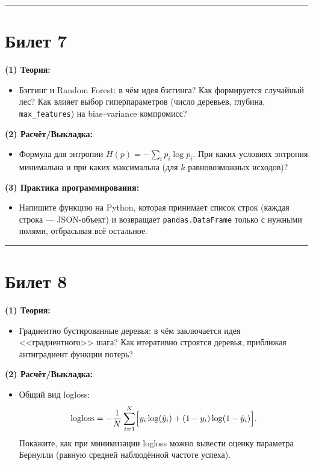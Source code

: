 \documentclass[a4paper,12pt]{article}
\begin{document}
\noindent\rule{\textwidth}{0.4pt}
\newpage

\section*{Билет 7}
\textbf{(1) Теория:}
\begin{itemize}
  \item Бэггинг и Random Forest: в чём идея бэггинга? Как формируется случайный лес? Как влияет выбор гиперпараметров (число деревьев, глубина, \texttt{max\_features}) на bias--variance компромисс?
\end{itemize}

\textbf{(2) Расчёт/Выкладка:}
\begin{itemize}
  \item Формула для энтропии $H(p) = -\sum_i p_i \log p_i$. При каких условиях энтропия минимальна и при каких максимальна (для $k$ равновозможных исходов)?
\end{itemize}

\textbf{(3) Практика программирования:}
\begin{itemize}
  \item Напишите функцию на Python, которая принимает список строк (каждая строка --- JSON-объект) и возвращает \texttt{pandas.DataFrame} только с нужными полями, отбрасывая всё остальное.
\end{itemize}

\noindent\rule{\textwidth}{0.4pt}
\newpage

\section*{Билет 8}
\textbf{(1) Теория:}
\begin{itemize}
  \item Градиентно бустированные деревья: в чём заключается идея <<градиентного>> шага? Как итеративно строятся деревья, приближая антиградиент функции потерь?
\end{itemize}

\textbf{(2) Расчёт/Выкладка:}
\begin{itemize}
  \item Общий вид logloss:
    \[
      \text{logloss} = -\frac{1}{N}\sum_{i=1}^N \Bigl[ y_i \log(\hat{y}_i) + (1-y_i)\log(1-\hat{y}_i) \Bigr].
    \]
    Покажите, как при минимизации logloss можно вывести оценку параметра Бернулли (равную средней наблюдённой частоте успеха).
\end{itemize}
\end{document}
